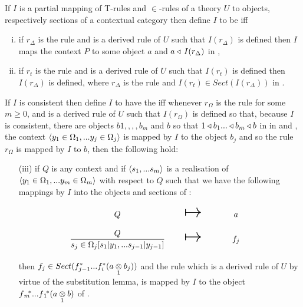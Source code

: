 \begin{newtt}
\begin{definition}
\newcommand {\forceSOURCEwidth}{\rule{5cm}{0pt}}  %
\newcommand {\forceTARGETwidth}{\rule{2.2cm}{0pt}}
If $I$ is a partial mapping of T-rules and $\in$-rules of a theory $U$ to objects, respectively sections of a contextual category \catcw
then define $I$ to be  iff
\begin{enumerate}[(i)]
\item if $r_\Delta$ is the rule  and is a derived rule of $U$
such that $I(r_\Delta)$ is defined 
then $I$ maps the context $P$ to some object $a$ and $a \base\, I(r_\Delta)$ in \catc,
\item if $r_t$ is the rule  and is a derived rule of $U$ 
such that $I(r_t)$ is defined 
then $I(r_\Delta)$
is defined, where $r_\Delta$ is the rule   and $I(r_t) \in Sect(I(r_\Delta))$ in \catc.
\end{enumerate}
If $I$ is consistent then define $I$ to have the  iff 
whenever $r_\Omega$ is the rule \omegarule[,] for some $m \geq 0$, and is a derived rule of $U$ 
such that $I(r_\Omega)$ is defined
so that, because $I$ is consistent,
there are objects $b1,,,,b_m$ and $b$ so  that $1 \base b_1 ... \base b_m \base b$ in
in \catcw and \foreachj, the context $\encyOmega{j}$  is mapped by $I$ to the object $b_j$ and 
so the rule $r_\Omega$ is mapped by $I$ to $b$, 
then the following hold:
\begin{enumerate}
\item [(iii)] 
if $Q$ is any context and if $\tuple{\sm}$ is a realisation of $\tuple{\yOmega{m}}$ with respect to $Q$
such that we have the following mappings by $I$ into the objects and sections of \catc:
\begin{equation*}
\begin{array}{c c c}
\forceSOURCEwidth & & \forceTARGETwidth \\ [-0.1cm]
Q          & \Imapsto & a   \\ [0.4cm]
\sjrule    & \Imapsto & f_j \\ [0.4cm]
\end{array}
\end{equation*}
then $f_j \in Sect(f_{j-1}^*...f_i^*(\crossx{a}{b_j}{1}))$
and the rule \omegarulesubstituted[,] which is a derived rule of $U$ by virtue of the substitution lemma, is mapped by $I$ 
to the object $\fmstar...\fonestar (\crossx{a}{b}{1})$ of \catc.


\end{enumerate}
\end{definition}
\end{newtt}
